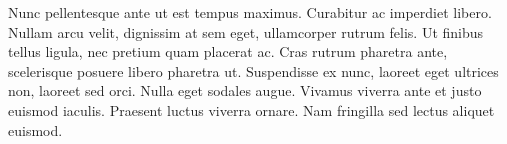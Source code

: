 Nunc pellentesque ante ut est tempus maximus. Curabitur ac imperdiet libero. Nullam arcu velit, dignissim at sem eget, ullamcorper rutrum felis. Ut finibus tellus ligula, nec pretium quam placerat ac. Cras rutrum pharetra ante, scelerisque posuere libero pharetra ut. Suspendisse ex nunc, laoreet eget ultrices non, laoreet sed orci. Nulla eget sodales augue. Vivamus viverra ante et justo euismod iaculis. Praesent luctus viverra ornare. Nam fringilla sed lectus aliquet euismod.
